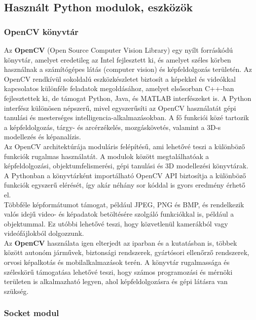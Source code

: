 \documentclass[12pt,a4paper]{article}
\newcommand{\code}[1]{\tcbox{\texttt{#1}}}
\begin{document}
\subsection{Használt Python modulok, eszközök}
\subsubsection*{OpenCV könyvtár}
Az \textbf{OpenCV} (Open Source Computer Vision Library) egy nyílt forráskódú könyvtár, amelyet eredetileg az Intel fejlesztett ki, és amelyet széles körben használnak a számítógépes látás (computer vision) és képfeldolgozás területén. Az OpenCV rendkívül sokoldalú eszközkészletet biztosít a képekkel és videókkal kapcsolatos különféle feladatok megoldásához, amelyet elsősorban C++-ban fejlesztettek ki, de támogat Python, Java, és MATLAB interfészeket is. A Python interfész különösen népszerű, mivel egyszerűsíti az OpenCV használatát gépi tanulási és mesterséges intelligencia-alkalmazásokban. A fő funkciói közé tartozik a képfeldolgozás, tárgy- és arcérzékelés, mozgáskövetés, valamint a 3D-s modellezés és képanalízis.\\

Az OpenCV architektúrája moduláris felépítésű, ami lehetővé teszi a különböző funkciók rugalmas használatát. A modulok között megtalálhatóak a képfeldolgozási, objektumfelismerési, gépi tanulási és 3D modellezési könyvtárak. A Pythonban a \code{cv2} könyvtárként importálható OpenCV API biztosítja a különböző funkciók egyszerű elérését, így akár néhány sor kóddal is gyors eredmény érhető el.\\

Többféle képformátumot támogat, például JPEG, PNG és BMP, és rendelkezik valós idejű video- és képadatok betöltésére szolgáló funkciókkal is, például a \code{VideoCapture} objektummal. Ez utóbbi lehetővé teszi, hogy közvetlenül kamerákból vagy videófájlokból dolgozzunk.\\

Az \textbf{OpenCV }használata igen elterjedt az iparban és a kutatásban is, többek között autonóm járművek, biztonsági rendszerek, gyártósori ellenőrző rendszerek, orvosi képalkotás és mobilalkalmazások terén. A könyvtár rugalmassága és széleskörű támogatása lehetővé teszi, hogy számos programozási és mérnöki területen is alkalmazható legyen, ahol képfeldolgozásra és gépi látásra van szükség.

\subsubsection*{Socket modul}
\end{document}
